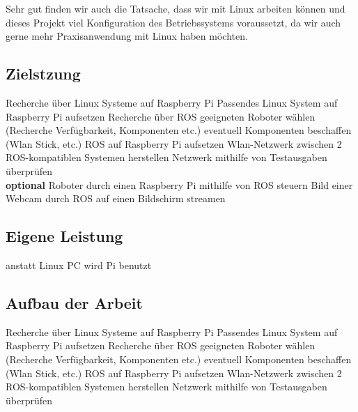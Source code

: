 \documentclass[12pt]{article}
\begin{document}
Sehr gut finden wir auch die Tatsache, dass wir mit Linux arbeiten können und dieses
Projekt viel Konfiguration des Betriebssystems voraussetzt, da wir auch gerne mehr
Praxisanwendung mit Linux haben möchten.








\subsection{Zielstzung}

Recherche über Linux Systeme auf Raspberry Pi
Passendes Linux System auf Raspberry Pi aufsetzen					
Recherche über ROS									
geeigneten Roboter wählen (Recherche Verfügbarkeit, Komponenten etc.)	
eventuell Komponenten beschaffen (Wlan Stick, etc.)				
ROS auf Raspberry Pi aufsetzen
Wlan-Netzwerk zwischen 2 ROS-kompatiblen Systemen herstellen
Netzwerk mithilfe von Testausgaben überprüfen \\

{\bf optional}
Roboter durch einen Raspberry Pi mithilfe von ROS steuern
Bild einer Webcam durch ROS auf einen Bildschirm streamen

\subsection{Eigene Leistung}

anstatt Linux PC wird Pi benutzt

\subsection{Aufbau der Arbeit}

Recherche über Linux Systeme auf Raspberry Pi
Passendes Linux System auf Raspberry Pi aufsetzen					
Recherche über ROS									
geeigneten Roboter wählen (Recherche Verfügbarkeit, Komponenten etc.)	
eventuell Komponenten beschaffen (Wlan Stick, etc.)				
ROS auf Raspberry Pi aufsetzen		
Wlan-Netzwerk zwischen 2 ROS-kompatiblen Systemen herstellen
Netzwerk mithilfe von Testausgaben überprüfen \\
\end{document}
